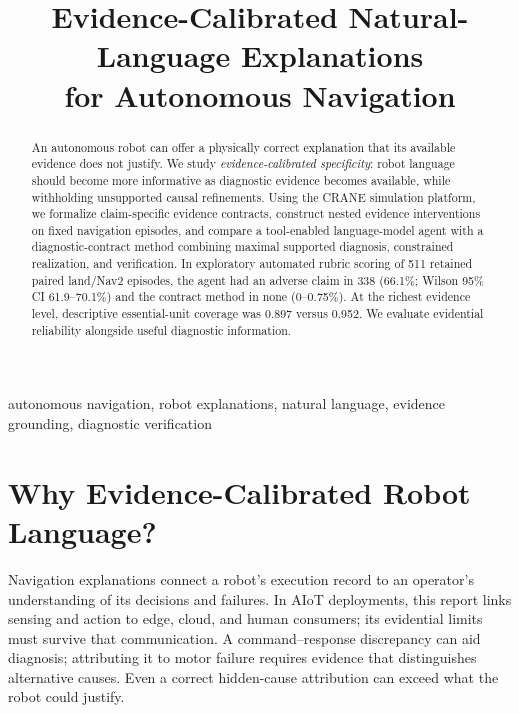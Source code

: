 \documentclass[conference]{IEEEtran}
\begin{document}
\title{Evidence-Calibrated Natural-Language Explanations\\for Autonomous Navigation}
\author{
}
\maketitle

\begin{abstract}
An autonomous robot can offer a physically correct explanation that its available evidence does not justify. We study \emph{evidence-calibrated specificity}: robot language should become more informative as diagnostic evidence becomes available, while withholding unsupported causal refinements. Using the CRANE simulation platform, we formalize claim-specific evidence contracts, construct nested evidence interventions on fixed navigation episodes, and compare a tool-enabled language-model agent with a diagnostic-contract method combining maximal supported diagnosis, constrained realization, and verification. In exploratory automated rubric scoring of 511 retained paired land/Nav2 episodes, the agent had an adverse claim in 338 (66.1\%; Wilson 95\% CI 61.9--70.1\%) and the contract method in none (0--0.75\%). At the richest evidence level, descriptive essential-unit coverage was 0.897 versus 0.952. We evaluate evidential reliability alongside useful diagnostic information.
\end{abstract}

\begin{IEEEkeywords}
autonomous navigation, robot explanations, natural language, evidence grounding, diagnostic verification
\end{IEEEkeywords}

\section{Why Evidence-Calibrated Robot Language?}
Navigation explanations connect a robot's execution record to an operator's understanding of its decisions and failures. In AIoT deployments, this report links sensing and action to edge, cloud, and human consumers; its evidential limits must survive that communication. A command--response discrepancy can aid diagnosis; attributing it to motor failure requires evidence that distinguishes alternative causes. Even a correct hidden-cause attribution can exceed what the robot could justify.
\end{document}
